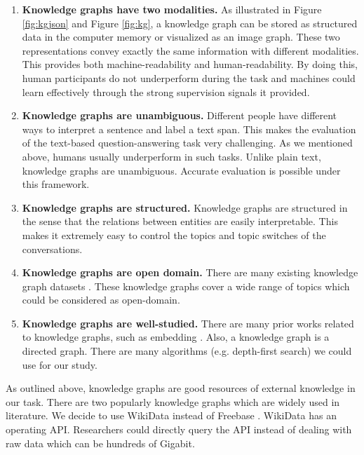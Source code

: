 \documentclass[bsc,frontabs,twoside,singlespacing,parskip,deptreport]{infthesis}     %
\begin{document}
\begin{enumerate}
   \item \textbf{Knowledge graphs have two modalities.} 
   As illustrated in Figure \ref{fig:kgjson} and Figure \ref{fig:kg}, a knowledge graph can be stored as structured data in the computer memory or visualized as an image graph. These two representations convey exactly the same information with different modalities. This provides both machine-readability and human-readability. By doing this, human participants do not underperform during the task and machines could learn effectively through the strong supervision signals it provided.
   
   \item \textbf{Knowledge graphs are unambiguous.} Different people have different ways to interpret a sentence and label a text span. This makes the evaluation of the text-based question-answering task very challenging. As we mentioned above, humans usually underperform in such tasks. Unlike plain text, knowledge graphs are unambiguous. Accurate evaluation is possible under this framework.
   
   \item  \textbf{Knowledge graphs are structured.} Knowledge graphs are structured in the sense that the relations between entities are easily interpretable. This makes it extremely easy to control the topics and topic switches of the conversations.
   
    \item \textbf{Knowledge graphs are open domain.} There are many existing knowledge graph datasets \cite{vrandevcic2014wikidata,bollacker2008freebase}. These knowledge graphs cover a wide range of topics which could be considered as open-domain.
    
    \item \textbf{Knowledge graphs are well-studied.} There are many prior works related to knowledge graphs, such as embedding \cite{lin2015learning}. Also, a knowledge graph is a directed graph. There are many algorithms (e.g. depth-first search) we could use for our study.
    

\end{enumerate}


As outlined above, knowledge graphs are good resources of external knowledge in our task. There are two popularly knowledge graphs which are widely used in literature. We decide to use WikiData \cite{vrandevcic2014wikidata} instead of Freebase \cite{bollacker2008freebase}. WikiData has an operating API. Researchers could directly query the API instead of dealing with raw data which can be hundreds of Gigabit.
\end{document}
